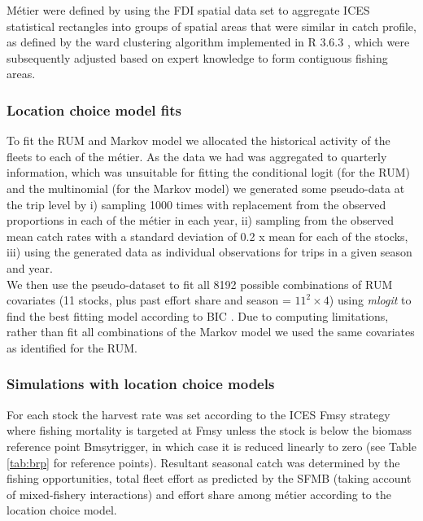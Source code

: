 \documentclass[12pt, halfline, a4paper]{ouparticle}
\begin{document}
Métier were defined by using the FDI spatial data set to aggregate ICES
statistical rectangles into groups of spatial areas that were similar in catch
profile, as defined by the ward clustering algorithm implemented in R 3.6.3
\citep{Team2020}, which were subsequently adjusted based on expert knowledge to
form contiguous fishing areas. \\ 

\subsubsection{Location choice model fits}

To fit the RUM and Markov model we allocated the historical activity of the
fleets to each of the métier. As the data we had was aggregated to quarterly
information, which was unsuitable for fitting the conditional logit (for the
RUM) and the multinomial (for the Markov model) we generated some pseudo-data
at the trip level by i) sampling 1000 times with replacement from the observed
proportions in each of the métier in each year, ii) sampling from the observed
mean catch rates with a standard deviation of 0.2 x mean for each of the
stocks, iii) using the generated data as individual observations for trips in a
given season and year.  \\

We then use the pseudo-dataset to fit all 8192 possible combinations of RUM
covariates (11 stocks, plus past effort share and season = $11^2 \times 4$)
using \textit{mlogit} to find the best fitting model according to BIC
\citep{Schwarz1978}. Due to computing limitations, rather than fit all
combinations of the Markov model we used the same covariates as identified for
the RUM. 

\subsubsection{Simulations with location choice models}

For each stock the harvest rate was set according to the ICES Fmsy strategy
where fishing mortality is targeted at Fmsy unless the stock is below the
biomass reference point Bmsytrigger, in which case it is reduced linearly to
zero (see Table \ref{tab:brp} for reference points). Resultant seasonal catch
was determined by the fishing opportunities, total fleet effort as predicted by
the SFMB (taking account of mixed-fishery interactions) and effort share among
métier according to the location choice model. \\
\end{document}
